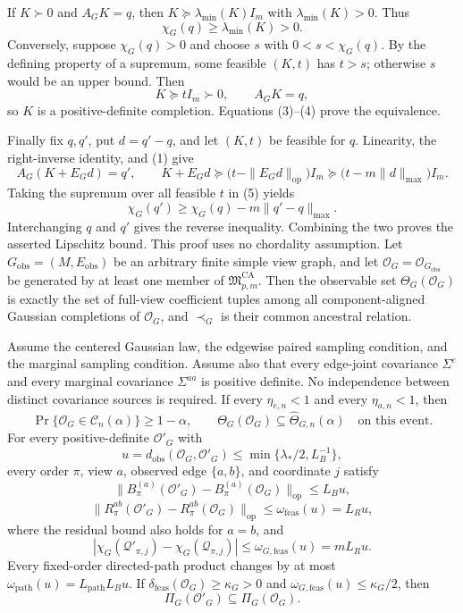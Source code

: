 If \(K\succ0\) and \(A_GK=q\), then \(K\succeq\lambda_{\min}(K)I_m\) with \(\lambda_{\min}(K)>0\).  Thus
\[
\chi_G(q)\ge\lambda_{\min}(K)>0.
\tag{3}
\]
Conversely, suppose \(\chi_G(q)>0\) and choose \(s\) with \(0<s<\chi_G(q)\).  By the defining property of a supremum, some feasible \((K,t)\) has \(t>s\); otherwise \(s\) would be an upper bound.  Then
\[
K\succeq tI_m\succ0,
\qquad A_GK=q,
\tag{4}
\]
so \(K\) is a positive-definite completion.  Equations (3)--(4) prove the equivalence.

Finally fix \(q,q'\), put \(d=q'-q\), and let \((K,t)\) be feasible for \(q\).  Linearity, the right-inverse identity, and (1) give
\[
A_G(K+E_Gd)=q',
\qquad
K+E_Gd\succeq
\bigl(t-\|E_Gd\|_{\mathrm{op}}\bigr)I_m
\succeq
\bigl(t-m\|d\|_{\max}\bigr)I_m.
\tag{5}
\]
Taking the supremum over all feasible \(t\) in (5) yields
\[
\chi_G(q')\ge\chi_G(q)-m\|q'-q\|_{\max}.
\tag{6}
\]
Interchanging \(q\) and \(q'\) gives the reverse inequality.  Combining the two proves the asserted Lipschitz bound.  This proof uses no chordality assumption.
Let \(G_{\mathrm{obs}}=(M,E_{\mathrm{obs}})\) be an arbitrary finite simple view graph, and let \(\mathcal O_G=\mathcal O_{G_{\mathrm{obs}}}\) be generated by at least one member of \(\mathfrak M_{p,m}^{\mathrm{CA}}\).  Then the observable set \(\Theta_G(\mathcal O_G)\) is exactly the set of full-view coefficient tuples among all component-aligned Gaussian completions of \(\mathcal O_G\), and \(\prec_G\) is their common ancestral relation.

Assume the centered Gaussian law, the edgewise paired sampling condition, and the marginal sampling condition.  Assume also that every edge-joint covariance \(\Sigma^e\) and every marginal covariance \(\Sigma^{aa}\) is positive definite.  No independence between distinct covariance sources is required.  If every \(\eta_{e,n}<1\) and every \(\eta_{a,n}<1\), then
\[
\Pr\{\mathcal O_G\in\mathcal C_n(\alpha)\}\ge1-\alpha,
\qquad
\Theta_G(\mathcal O_G)\subseteq\widehat\Theta_{G,n}(\alpha)
\quad\text{on this event}.
\]
For every positive-definite \(\mathcal O'_G\) with
\[
u=d_{\mathrm{obs}}(\mathcal O_G,\mathcal O'_G)
\le\min\{\lambda_*/2,L_B^{-1}\},
\]
every order \(\pi\), view \(a\), observed edge \(\{a,b\}\), and coordinate \(j\) satisfy
\[
\|B_\pi^{(a)}(\mathcal O'_G)-B_\pi^{(a)}(\mathcal O_G)\|_{\mathrm{op}}\le L_Bu,
\]
\[
\|R_\pi^{ab}(\mathcal O'_G)-R_\pi^{ab}(\mathcal O_G)\|_{\mathrm{op}}
\le\omega_{\mathrm{feas}}(u)=L_Ru,
\]
where the residual bound also holds for \(a=b\), and
\[
|\chi_G(\mathcal Q'_{\pi,j})-\chi_G(\mathcal Q_{\pi,j})|
\le\omega_{G,\mathrm{feas}}(u)=mL_Ru.
\]
Every fixed-order directed-path product changes by at most \(\omega_{\mathrm{path}}(u)=L_{\mathrm{path}}L_Bu\).  If \(\delta_{\mathrm{feas}}(\mathcal O_G)\ge\kappa_G>0\) and \(\omega_{G,\mathrm{feas}}(u)\le\kappa_G/2\), then
\[
\Pi_G(\mathcal O'_G)\subseteq\Pi_G(\mathcal O_G).
\]

